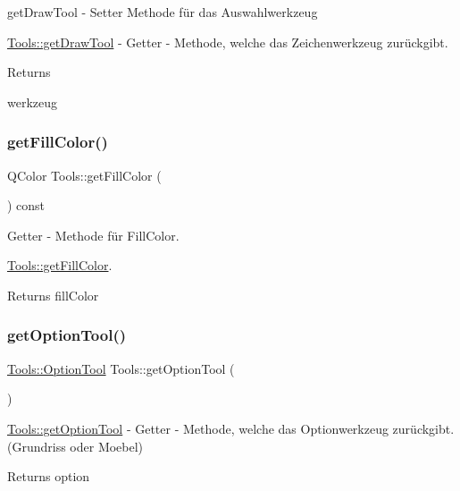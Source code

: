 get\+Draw\+Tool -\/ Setter Methode für das Auswahlwerkzeug 

\hyperlink{class_tools_a4e8bdc1c74c1d9b5969c6b8afef0f805}{Tools\+::get\+Draw\+Tool} -\/ Getter -\/ Methode, welche das Zeichenwerkzeug zurückgibt.

\begin{DoxyReturn}{Returns}


werkzeug 
\end{DoxyReturn}
\mbox{\label{class_tools_acb1e17bcb34c9290423b55a7f92d9936}} 
\subsubsection{\texorpdfstring{get\+Fill\+Color()}{getFillColor()}}
{\footnotesize\ttfamily Q\+Color Tools\+::get\+Fill\+Color (\begin{DoxyParamCaption}{ }\end{DoxyParamCaption}) const}



Getter -\/ Methode für Fill\+Color. 

\hyperlink{class_tools_acb1e17bcb34c9290423b55a7f92d9936}{Tools\+::get\+Fill\+Color}.

\begin{DoxyReturn}{Returns}
fill\+Color 
\end{DoxyReturn}
\mbox{\label{class_tools_a45d1e69e6f93c92df35756f3b48092ca}} 
\subsubsection{\texorpdfstring{get\+Option\+Tool()}{getOptionTool()}}
{\footnotesize\ttfamily \hyperlink{class_tools_a4b55b2ca4eef4d80ae1042233832bb8b}{Tools\+::\+Option\+Tool} Tools\+::get\+Option\+Tool (\begin{DoxyParamCaption}{ }\end{DoxyParamCaption})}



\hyperlink{class_tools_a45d1e69e6f93c92df35756f3b48092ca}{Tools\+::get\+Option\+Tool} -\/ Getter -\/ Methode, welche das Optionwerkzeug zurückgibt. (Grundriss oder Moebel) 

\begin{DoxyReturn}{Returns}
option 
\end{DoxyReturn}
\mbox{\label{class_tools_ae81ec47ff47279c8a8f319d822c3bb9f}} 
